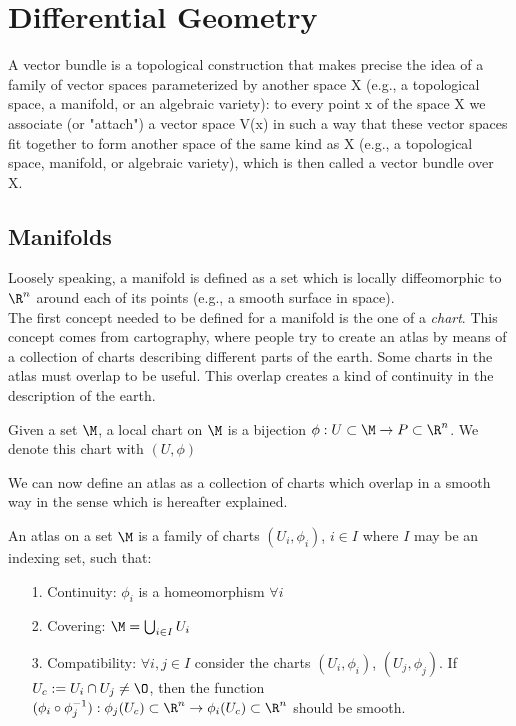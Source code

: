 \section{Differential Geometry}
%
%
\begin{defn}
	A vector bundle is a topological construction that makes precise the idea of a family of vector spaces parameterized by another space X (e.g., a topological space, a manifold, or an algebraic variety): to every point x of the space X we associate (or "attach") a vector space V(x) in such a way that these vector spaces fit together to form another space of the same kind as X (e.g., a topological space, manifold, or algebraic variety), which is then called a vector bundle over X.
\end{defn}
%
%
\subsection{Manifolds}
Loosely speaking, a manifold is defined as a set which is locally diffeomorphic to $\R^n$ around each of its points (e.g., a smooth surface in space).\\
The first concept needed to be defined for a manifold is the one of a \textit{chart}. This concept comes from cartography, where people try to create an atlas by
means of a collection of charts describing different parts of the earth. Some charts in the atlas must overlap to be useful. This overlap creates a kind of
continuity in the description of the earth. 
%
\begin{defn}[Chart]
	Given a set $\M$, a local chart on $\M$ is a bijection $\phi:U\subset\M\rightarrow P\subset\R^n$. We denote this chart with $(U,\phi)$
\end{defn}
%
We can now define an atlas as a collection of charts which overlap in a smooth way in the sense which is hereafter explained. 
%
\begin{defn}[Atlas]
	An atlas on a set $\M$ is a family of charts $(U_i,\phi_i)$, $i\in I$ where $I$ may be an indexing set, such that:
	\begin{itemize}
		\item[1.] Continuity: $\phi_i$ is a homeomorphism $\forall i$
		\item[2.] Covering: $\M = \bigcup_{i\in I}U_i$
		\item[3.] Compatibility: $\forall i,j\in I$ consider the charts $(U_i,\phi_i)$, $(U_j,\phi_j)$. If $U_c := U_i\cap U_j \neq \O$, then the function $(\phi_i\circ\phi_j^{-1}):\phi_j(U_c)\subset\R^n\rightarrow\phi_i(U_c)\subset\R^n$ should be smooth.	
	\end{itemize}
\end{defn}
